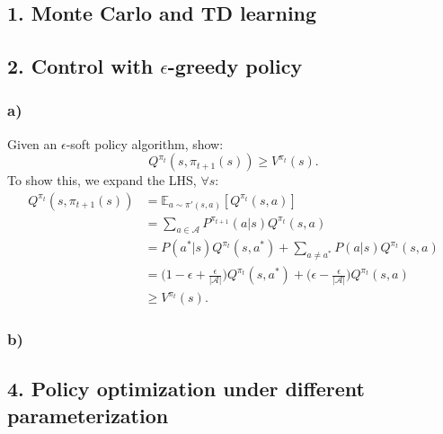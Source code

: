 \documentclass[12pt]{article}
\begin{document}
\subsection*{1. Monte Carlo and TD learning}
\subsection*{2. Control with $\epsilon$-greedy policy}
\subsubsection*{a)}
Given an $\epsilon$-soft policy algorithm, show:
\begin{equation}
	Q^{\pi_t}(s,\pi_{t+1}(s)) \geq V^{\pi_t}(s).
\end{equation}
To show this, we expand the LHS, $\forall s$:
\begin{equation}
	\begin{split}
		Q^{\pi_t}(s,\pi_{t+1}(s)) &= \mathbb{E}_{a\sim\pi'(s,a)}[Q^{\pi_{t}}(s,a)] \\
		&= \sum_{a \in \mathcal{A}} P^{\pi_{t+1}}(a|s)Q^{\pi_{t}}(s,a) \\
		&= P(a^*|s)Q^{\pi_{t}}(s,a^*) + \sum_{a \neq a^*}P(a|s)Q^{\pi_{t}}(s,a) \\
		&=\Big(1-\epsilon+\frac{\epsilon}{|\mathcal{A}|}\Big)Q^{\pi_{t}}(s,a^*) + \Big(\epsilon - \frac{\epsilon}{|\mathcal{A}|}\Big)Q^{\pi_{t}}(s,a) \\
		&\geq V^{\pi_t}(s).
	\end{split}
\end{equation}
\subsubsection*{b)}


\subsection*{4. Policy optimization under different parameterization}
\end{document}
